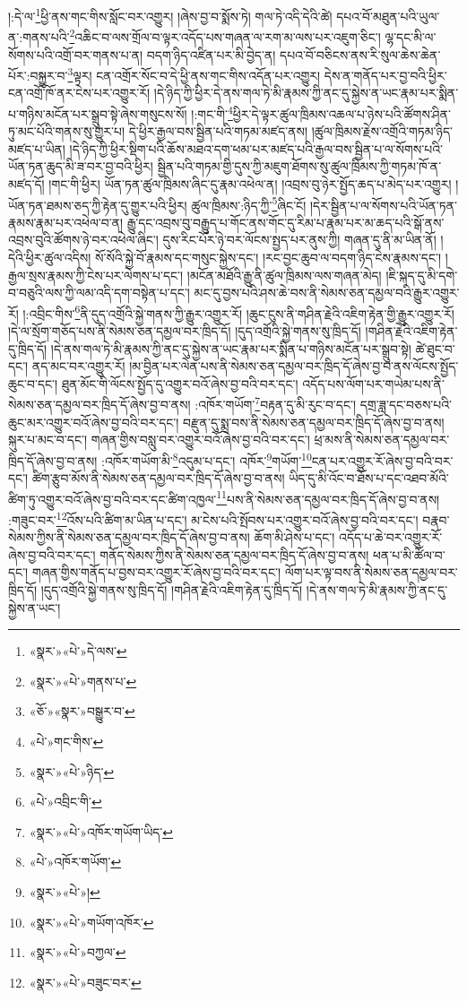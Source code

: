 །:དེ་ལ་\footnote{«སྣར་»«པེ་»དེ་ལས་}ཕྱི་ནས་གང་གིས་སློང་བར་འགྱུར། །ཞེས་བྱ་བ་སྨོས་ཏེ། གལ་ཏེ་འདི་དེའི་ཚེ། དཔའ་བོ་མཐུན་པའི་ཡུལ་ན་:གནས་པའི་\footnote{«སྣར་»«པེ་»གནས་པ་}འཆིང་བ་ལས་གྲོལ་བ་ལྟར་འདོད་པས་གཞན་ལ་རག་མ་ལས་པར་འཇུག་ཅིང་། ལྷ་དང་མི་ལ་སོགས་པའི་འགྲོ་བར་གནས་པ་ན། བདག་ཉིད་འཛིན་པར་མི་བྱེད་ན། དཔའ་བོ་བཅིངས་ནས་རི་སུལ་ཆེས་ཆེན་པོར་:བསྐྱུར་བ་\footnote{«ཅོ་»«སྣར་»བསྒྱུར་བ་}ལྟར། ངན་འགྲོར་སོང་བ་དེ་ཕྱི་ནས་གང་གིས་འདོན་པར་འགྱུར། དེས་ན་གནོད་པར་བྱ་བའི་ཕྱིར་ངན་འགྲོ་ཁོ་ནར་ངེས་པར་འགྱུར་རོ། །དེ་ཉིད་ཀྱི་ཕྱིར་དེ་ནས་གལ་ཏེ་མི་རྣམས་ཀྱི་ནང་དུ་སྐྱེས་ན་ཡང་རྣམ་པར་སྨིན་པ་གཉིས་མངོན་པར་སྒྲུབ་སྟེ་ཞེས་གསུངས་སོ། །:གང་གི་\footnote{«པེ་»གང་གིས་}ཕྱིར་དེ་ལྟར་ཚུལ་ཁྲིམས་འཆལ་པ་ཉེས་པའི་ཚོགས་ཤིན་ཏུ་མང་པོའི་གནས་སུ་གྱུར་པ། དེ་ཕྱིར་རྒྱལ་བས་སྦྱིན་པའི་གཏམ་མཛད་ནས། །ཚུལ་ཁྲིམས་རྗེས་འགྲོའི་གཏམ་ཉིད་མཛད་པ་ཡིན། །དེ་ཉིད་ཀྱི་ཕྱིར་སྡིག་པའི་ཆོས་མཐའ་དག་ཕམ་པར་མཛད་པའི་རྒྱལ་བས་སྦྱིན་པ་ལ་སོགས་པའི་ཡོན་ཏན་ཆུད་མི་ཟ་བར་བྱ་བའི་ཕྱིར། སྦྱིན་པའི་གཏམ་གྱི་དུས་ཀྱི་མཇུག་ཐོགས་སུ་ཚུལ་ཁྲིམས་ཀྱི་གཏམ་ཁོ་ན་མཛད་དོ། །གང་གི་ཕྱིར། ཡོན་ཏན་ཚུལ་ཁྲིམས་ཞིང་དུ་རྣམ་འཕེལ་ན། །འབྲས་བུ་ཉེར་སྤྱོད་ཆད་པ་མེད་པར་འགྱུར། །ཡོན་ཏན་ཐམས་ཅད་ཀྱི་རྟེན་དུ་གྱུར་པའི་ཕྱིར། ཚུལ་ཁྲིམས་:ཉིད་ཀྱི་\footnote{«སྣར་»«པེ་»ཉིད་}ཞིང་ངོ། །དེར་སྦྱིན་པ་ལ་སོགས་པའི་ཡོན་ཏན་རྣམས་རྣམ་པར་འཕེལ་བ་ན། རྒྱུ་དང་འབྲས་བུ་བརྒྱུད་པ་གོང་ནས་གོང་དུ་རིམ་པ་རྣམ་པར་མ་ཆད་པའི་སྒོ་ནས་འབྲས་བུའི་ཚོགས་ཉེ་བར་འཕེལ་ཞིང་། དུས་རིང་པོར་ཉེ་བར་ལོངས་སྤྱད་པར་ནུས་ཀྱི། གཞན་དུ་ནི་མ་ཡིན་ནོ། །དེའི་ཕྱིར་ཚུལ་འདིས། སོ་སོའི་སྐྱེ་བོ་རྣམས་དང་གསུང་སྐྱེས་དང་། །རང་བྱང་ཆུབ་ལ་བདག་ཉིད་ངེས་རྣམས་དང་། །རྒྱལ་སྲས་རྣམས་ཀྱི་ངེས་པར་ལེགས་པ་དང་། །མངོན་མཐོའི་རྒྱུ་ནི་ཚུལ་ཁྲིམས་ལས་གཞན་མེད། །ཇི་སྐད་དུ་མི་དགེ་བ་བཅུའི་ལས་ཀྱི་ལམ་འདི་དག་བསྟེན་པ་དང་། མང་དུ་བྱས་པའི་ཤས་ཆེ་བས་ནི་སེམས་ཅན་དམྱལ་བའི་རྒྱུར་འགྱུར་རོ། །:འབྲིང་གིས་\footnote{«པེ་»འབྲིང་གི་}ནི་དུད་འགྲོའི་སྐྱེ་གནས་ཀྱི་རྒྱུར་འགྱུར་རོ། །ཆུང་ངུས་ནི་གཤིན་རྗེའི་འཇིག་རྟེན་གྱི་རྒྱུར་འགྱུར་རོ། །དེ་ལ་སྲོག་གཅོད་པས་ནི་སེམས་ཅན་དམྱལ་བར་ཁྲིད་དོ། །དུད་འགྲོའི་སྐྱེ་གནས་སུ་ཁྲིད་དོ། །གཤིན་རྗེའི་འཇིག་རྟེན་དུ་ཁྲིད་དོ། །དེ་ནས་གལ་ཏེ་མི་རྣམས་ཀྱི་ནང་དུ་སྐྱེས་ན་ཡང་རྣམ་པར་སྨིན་པ་གཉིས་མངོན་པར་སྒྲུབ་སྟེ། ཚེ་ཐུང་བ་དང་། ནད་མང་བར་འགྱུར་རོ། །མ་བྱིན་པར་ལེན་པས་ནི་སེམས་ཅན་དམྱལ་བར་ཁྲིད་དོ་ཞེས་བྱ་བ་ནས་ལོངས་སྤྱོད་ཆུང་བ་དང་། ཐུན་མོང་གི་ལོངས་སྤྱོད་དུ་འགྱུར་བའོ་ཞེས་བྱ་བའི་བར་དང་། འདོད་པས་ལོག་པར་གཡེམ་པས་ནི་སེམས་ཅན་དམྱལ་བར་ཁྲིད་དོ་ཞེས་བྱ་བ་ནས། :འཁོར་གཡོག་\footnote{«སྣར་»«པེ་»འཁོར་གཡོག་ཡིད་}བརྟན་དུ་མི་རུང་བ་དང་། དགྲ་ཟླ་དང་བཅས་པའི་ཆུང་མར་འགྱུར་བའོ་ཞེས་བྱ་བའི་བར་དང་། བརྫུན་དུ་སྨྲ་བས་ནི་སེམས་ཅན་དམྱལ་བར་ཁྲིད་དོ་ཞེས་བྱ་བ་ནས། སྐུར་པ་མང་བ་དང་། གཞན་གྱིས་བསླུ་བར་འགྱུར་བའོ་ཞེས་བྱ་བའི་བར་དང་། ཕྲ་མས་ནི་སེམས་ཅན་དམྱལ་བར་ཁྲིད་དོ་ཞེས་བྱ་བ་ནས། :འཁོར་གཡོག་མི་\footnote{«པེ་»འཁོར་གཡོག་}འདུམ་པ་དང་། འཁོར་\footnote{«སྣར་»«པེ་»།}གཡོག་\footnote{«སྣར་»«པེ་»གཡོག་འཁོར་}ངན་པར་འགྱུར་རོ་ཞེས་བྱ་བའི་བར་དང་། ཚིག་རྩུབ་མོས་ནི་སེམས་ཅན་དམྱལ་བར་ཁྲིད་དོ་ཞེས་བྱ་བ་ནས། ཡིད་དུ་མི་འོང་བ་ཐོས་པ་དང་འཐབ་མོའི་ཚིག་ཏུ་འགྱུར་བའོ་ཞེས་བྱ་བའི་བར་དང་ཚིག་འཁྱལ་\footnote{«སྣར་»«པེ་»བཀྱལ་}པས་ནི་སེམས་ཅན་དམྱལ་བར་ཁྲིད་དོ་ཞེས་བྱ་བ་ནས། :གཟུང་བར་\footnote{«སྣར་»«པེ་»བཟུང་བར་}འོས་པའི་ཚིག་མ་ཡིན་པ་དང་། མ་ངེས་པའི་སྤོབས་པར་འགྱུར་བའོ་ཞེས་བྱ་བའི་བར་དང་། བརྣབ་སེམས་ཀྱིས་ནི་སེམས་ཅན་དམྱལ་བར་ཁྲིད་དོ་ཞེས་བྱ་བ་ནས། ཆོག་མི་ཤེས་པ་དང་། འདོད་པ་ཆེ་བར་འགྱུར་རོ་ཞེས་བྱ་བའི་བར་དང་། གནོད་སེམས་ཀྱིས་ནི་སེམས་ཅན་དམྱལ་བར་ཁྲིད་དོ་ཞེས་བྱ་བ་ནས། ཕན་པ་མི་ཚོལ་བ་དང་། གཞན་གྱིས་གནོད་པ་བྱས་བར་འགྱུར་རོ་ཞེས་བྱ་བའི་བར་དང་། ལོག་པར་ལྟ་བས་ནི་སེམས་ཅན་དམྱལ་བར་ཁྲིད་དོ། །དུད་འགྲོའི་སྐྱེ་གནས་སུ་ཁྲིད་དོ། །གཤིན་རྗེའི་འཇིག་རྟེན་དུ་ཁྲིད་དོ། །དེ་ནས་གལ་ཏེ་མི་རྣམས་ཀྱི་ནང་དུ་སྐྱེས་ན་ཡང་། 